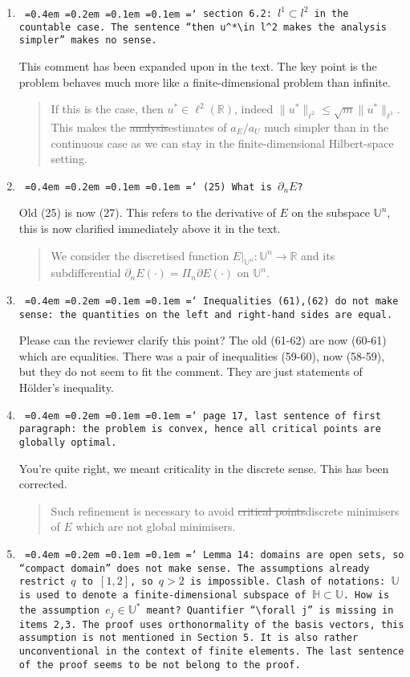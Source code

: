 \documentclass[12pt]{article}
\newcommand*\justify{%
	\fontdimen2\font=0.4em%
	\fontdimen3\font=0.2em%
	\fontdimen4\font=0.1em%
	\fontdimen7\font=0.1em%
	\hyphenchar\font=`\-%
}
\newcommand{\review}[1]{\texttt{\justify{#1}}}
\newcommand{\F}[1]{\mathbb{#1}}
\newcommand{\edit}[2]{{\color{red}\sout{#1}}{\color{darkgreen}#2}}
\begin{document}
\begin{enumerate}
	\item \review{section 6.2: $l^1\subset l^2$ in the countable case. The sentence ``then $u^*\in l^2$ makes the analysis simpler'' makes no sense.}
	
	This comment has been expanded upon in the text. The key point is the problem behaves much more like a finite-dimensional problem than infinite.
	\begin{quote}
		If this is the case, then $u^*\in \ell^2(\F R)$\edit{}{, indeed $\|u^*\|_{\ell^2}\leq\sqrt{m}\|u^*\|_{\ell^1}$. } This makes the \edit{analysis}{estimates of $a_E/a_U$} much simpler than in the continuous case\edit{}{ as we can stay in the finite-dimensional Hilbert-space setting}.
	\end{quote}
	
	\item \review{(25) What is $\partial_n E$?}
	
	Old (25) is now (27). This refers to the derivative of $E$ on the subspace $\F U^n$, this is now clarified immediately above it in the text.
	\begin{quote}
		\edit{}{We consider the discretised function $E|_{\F{U}^n}\colon \F{U}^n\to\F R$ and its subdifferential $\partial_nE(\cdot) = \Pi_n\partial E(\cdot)$ on $\F{U}^n$.} 
	\end{quote}
	
	\item \review{Inequalities (61),(62) do not make sense: the quantities on the left and right-hand sides are equal.}
	
	Please can the reviewer clarify this point? The old (61-62) are now (60-61) which are equalities. There was a pair of inequalities (59-60), now (58-59), but they do not seem to fit the comment. They are just statements of H\"older's inequality.
	
	\item \review{page 17, last sentence of first paragraph: the problem is convex, hence all critical points are globally optimal.}
	
	You're quite right, we meant criticality in the discrete sense. This has been corrected.
	\begin{quote}
		Such refinement is necessary to avoid \edit{critical points}{discrete minimisers} of $E$ which are not global minimisers.
	\end{quote}
	
	\item \review{Lemma 14: domains are open sets, so ``compact domain'' does not make sense. The assumptions already restrict $q$ to $[1, 2]$, so $q > 2$ is impossible. Clash of notations: $\mathbb U$ is used to denote a finite-dimensional subspace of $\mathbb H \subset \mathbb U$. How is the assumption $e_j \in \mathbb U^*$ meant? Quantifier ``$\forall j$'' is missing in items 2,3. The proof uses orthonormality of the basis vectors, this assumption is not mentioned in Section 5. It is also rather unconventional in the context of finite elements. The last sentence of the proof seems to be not belong to the proof.}
	

\end{enumerate}
\end{document}
